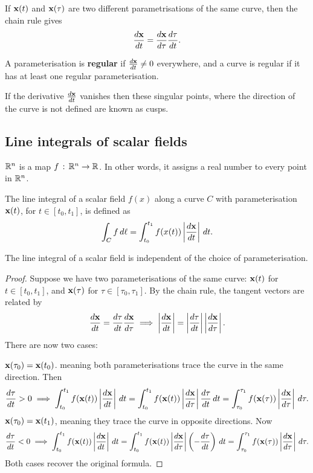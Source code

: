 \documentclass[10pt, a4paper]{article}
\begin{document}
If $\mathbf{x}(t)$ and $\mathbf{x}(\tau)$ are two different parametrisations of the same curve,
then the chain rule gives
\[
\frac{d\mathbf{x}}{dt} = \frac{d\mathbf{x}}{d\tau}\frac{d\tau}{dt}.
\]

A parameterisation is \textbf{regular} if $\frac{d\mathbf{x}}{dt} \neq 0$ everywhere,
and a curve is regular if it has at least one regular parameterisation.

If the derivative $\frac{d\mathbf{x}}{dt}$ vanishes then these singular points,
where the direction of the curve is not defined are known as cusps.

\subsection{Line integrals of scalar fields}
$\mathbb{R} ^ n$ is a map $f\,:\,\mathbb{R} ^ n \to \mathbb{R}$.
In other words,
it assigns a real number to every point in $\mathbb{R} ^ n$.

\begin{definition}
    The line integral of a scalar field $f(x)$ along a curve $C$ with parameterisation $\mathbf{x}(t)$,
    for $t \in [t_0, t_1]$,
    is defined as
    \[
    \int_{C}f\,d\ell = \int_{t_0}^{t_1}f(x(t))\left|\frac{d\mathbf{x}}{dt}\right|\,dt.
    \]
\end{definition}

\begin{proposition}
    The line integral of a scalar field is independent of the choice of parameterisation.

    \begin{proof}
        Suppose we have two parameterisations of the same curve:
        $\mathbf{x}(t)$ for $t \in [t_0, t_1]$,
        and $\mathbf{x}(\tau)$ for $\tau \in [\tau_0, \tau_1]$.
        By the chain rule,
        the tangent vectors are related by
        \[
        \frac{d\mathbf{x}}{dt} = \frac{d\tau}{dt}\frac{d\mathbf{x}}{d\tau} \implies \left|\frac{d\mathbf{x}}{dt}\right| = \left|\frac{d\tau}{dt}\right|\left|\frac{d\mathbf{x}}{d\tau}\right|.
        \]
        There are now two cases:

        $\mathbf{x}(\tau_0) = \mathbf{x}(t_0)$.
        meaning both parameterisations trace the curve in the same direction.
        Then
        \[
        \frac{d\tau}{dt} > 0 \implies \int_{t_0}^{t_1}f(\mathbf{x}(t))\left|\frac{d\mathbf{x}}{dt}\right|\,dt = \int_{t_0}^{t_1}f(\mathbf{x}(t))\left|\frac{d\mathbf{x}}{d\tau}\right|\frac{d\tau}{dt}\,dt = \int_{\tau_0}^{\tau_1}f(\mathbf{x}(\tau))\left|\frac{d\mathbf{x}}{d\tau}\right|\,d\tau.
        \]
        $\mathbf{x}(\tau_0) = \mathbf{x}(t_1)$,
        meaning they trace the curve in opposite directions.
        Now
        \[
        \frac{d\tau}{dt} < 0 \implies \int_{t_0}^{t_1}f(\mathbf{x}(t))\left|\frac{d\mathbf{x}}{dt}\right|\,dt = \int_{t_0}^{t_1}f(\mathbf{x}(t))\left|\frac{d\mathbf{x}}{d\tau}\right|\left(-\frac{d\tau}{dt}\right)\,dt = \int_{\tau_0}^{\tau_1}f(\mathbf{x}(\tau))\left|\frac{d\mathbf{x}}{d\tau}\right|\,d\tau.
        \]
        Both cases recover the original formula.
    \end{proof}
\end{proposition}
\end{document}
